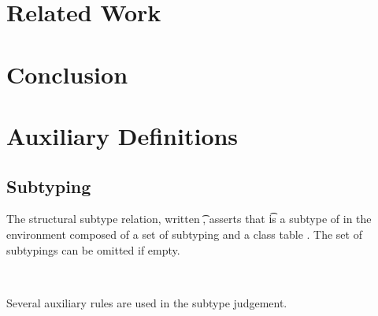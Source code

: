 \documentclass[a4paper,USenglish]{tex/lipics-v2016}
\begin{document}
\section{Related Work}

\section{Conclusion}





\appendix
\section{Auxiliary Definitions}%

\subsection{Subtyping}

The structural subtype relation, written \StrSub\M\K\t\tp, asserts that \t
is a subtype of \tp in the environment composed of a set of subtyping \M and
a class table \K.   The set of subtypings can be omitted if empty.

~\\

\begin{mathpar}


\end{mathpar}

Several auxiliary rules are used in the subtype judgement. 

\begin{mathpar}



\end{mathpar}
\end{document}
